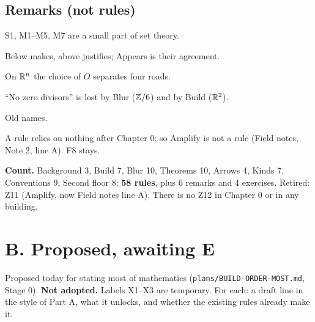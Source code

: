 \subsection*{Remarks (not rules)}
\begin{lines}
\item[\lab{R1}] S1, M1--M5, M7 are a small part of set theory.
\item[\lab{R2}] Below makes, above justifies; Appears is their agreement.
\item[\lab{R3}] On $\mathbb{R}^n$ the choice of $O$ separates four roads.
\item[\lab{R4}] ``No zero divisors'' is lost by Blur ($\mathbb{Z}/6$) and by Build ($\mathbb{R}^2$).
\item[\lab{R5}] Old names.
\item[\lab{R6}] A rule relies on nothing after Chapter 0; so Amplify is not a rule (Field notes, Note 2, line A). F8 stays.
\end{lines}

\textbf{Count.} Background 3, Build 7, Blur 10, Theorems 10, Arrows 4, Kinds 7, Conventions 9, Second floor 8: \textbf{58 rules}, plus 6 remarks and 4 exercises. Retired: Z11 (Amplify, now Field notes line A). There is no Z12 in Chapter 0 or in any building.

\section*{B. Proposed, awaiting E}

Proposed today for stating most of mathematics (\texttt{plans/BUILD-ORDER-MOST.md}, Stage 0). \textbf{Not adopted.} Labels X1--X3 are temporary. For each: a draft line in the style of Part A, what it unlocks, and whether the existing rules already make it.

